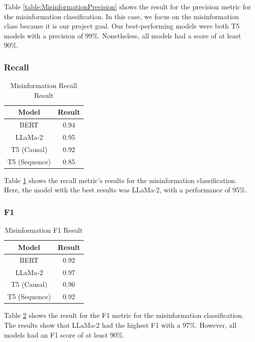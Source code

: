 Table \ref{table:MisinformationPrecision} shows the result for the precision metric for the misinformation classification. In this case, we focus on the misinformation
class because it is our project goal. Our best-performing models were both T5 models with a precision of 99\%. Nonetheless, all models had a score of at least 90\%.

\subsubsection{Recall}
\begin{table}[H]
	\centering
	\caption{Misinformation Recall Result}
	{
	\begin{tabular}{||c | c||} 
		\hline
		\textbf{Model} & \textbf{Result} \\ 
		\hline
		BERT & 0.94  \\
		\hline
		LLaMa-2 & 0.95 \\ 
		\hline
		T5 (Causal) & 0.92 \\
		\hline
		T5 (Sequence) & 0.85 \\
		\hline
	\end{tabular}
	}
	\label{table:MisinformationRecall}
\end{table}

Table \ref{table:MisinformationRecall} shows the recall metric's results for the misinformation classification. 
Here, the model with the best results was LLaMa-2,
with a performance of 95\%. 

\subsubsection{F1}
\begin{table}[H]
	\centering
	\caption{Misinformation F1 Result}
	{
	\begin{tabular}{||c | c||} 
		\hline
		\textbf{Model} & \textbf{Result} \\  
		\hline
		BERT & 0.92  \\
		\hline
		LLaMa-2 & 0.97 \\ 
		\hline
		T5 (Causal) & 0.96 \\
		\hline
		T5 (Sequence) & 0.92 \\
		\hline
	\end{tabular}
	}
	\label{table:MisinformationF1}
\end{table}

Table \ref{table:MisinformationF1}  shows the result for the F1 metric for the misinformation classification. The results show that LLaMa-2 had the highest F1 with a 97\%.
However, all models had an F1 score of at least 90\%.

